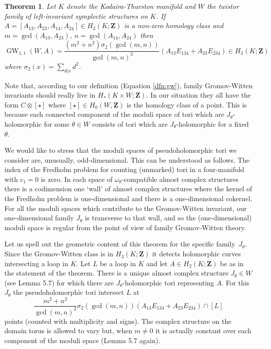 \documentclass[11pt]{amsart}
\newcommand{\ZZ}{\mathbf{Z}}
\newcommand{\GW}{\operatorname{GW}}
\newcommand{\WW}{W}
\numberwithin{equation}{section}
\newtheorem{thm}[equation]{Theorem}
\theoremstyle{definition}
\theoremstyle{remark}
\begin{document}
\begin{thm}\label{ourmainthm}
Let $K$ denote the Kodaira-Thurston manifold and $\WW$ the twistor family of left-invariant symplectic structures on $K$. If $A=[A_{13},A_{23},A_{14},A_{24}]\in H_2(K;\ZZ)$ is a non-zero homology class and $m=\gcd(A_{13},A_{23})$, $n=\gcd(A_{14},A_{24})$ then
\[\GW_{1,1}(\WW,A)=\frac{(m^2+n^2)\sigma_2(\gcd(m,n))}{\gcd(m,n)^3}(A_{13}E_{134}+A_{23}E_{234})\in H_3(K;\ZZ)\]
where $\sigma_2(x)=\sum_{d|x}d^2$.
\end{thm}

Note that, according to our definition (Equation \eqref{dfn:gw}), family Gromov-Witten invariants should really live in $H_*(K\times W;\ZZ)$. In our situation they all have the form $C\otimes[\star]$ where $[\star]\in H_0(W,\ZZ)$ is the homology class of a point. This is because each connected component of the moduli space of tori which are $J_{\theta}$-holomorphic for some $\theta\in\WW$ consists of tori which are $J_{\theta}$-holomorphic for a fixed $\theta$.

We would like to stress that the moduli spaces of pseudoholomorphic tori we consider are, unusually, odd-dimensional. This can be understood as follows. The index of the Fredholm problem for counting (unmarked) tori in a four-manifold with $c_1=0$ is zero. In each space of $\omega_{\theta}$-compatible almost complex structures there is a codimension one `wall' of almost complex structures where the kernel of the Fredholm problem is one-dimensional and there is a one-dimensional cokernel. For all the moduli spaces which contribute to the Gromov-Witten invariant, our one-dimensional family $J_{\theta}$ is transverse to that wall, and so the (one-dimensional) moduli space is regular from the point of view of family Gromov-Witten theory.

Let us spell out the geometric content of this theorem for the specific family~$J_{\theta}$. Since the Gromov-Witten class is in $H_3(K;\ZZ)$ it detects holomorphic curves intersecting a loop in $K$. Let $L$ be a loop in $K$ and let $A\in H_2(K;\ZZ)$ be as in the statement of the theorem. There is a unique almost complex structure $J_{\theta} \in \WW$ (see Lemma 5.7) for which there are $J_{\theta}$-holomorphic tori representing $A$. For this $J_{\theta}$ the pseudoholomorphic tori intersect $L$ at
\[\frac{m^2+n^2}{\gcd(m,n)^3}\sigma_2(\gcd(m,n))(A_{13}E_{134}+A_{23}E_{234}) \cap [L]\]
points (counted with multiplicity and signs). The complex structure on the domain torus is allowed to vary but, when $m\neq 0$ it is actually constant over each component of the moduli space (Lemma 5.7 again).
\end{document}

